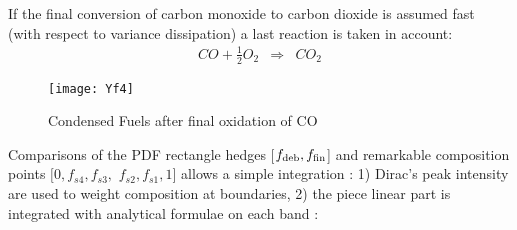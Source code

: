 If the final conversion of carbon monoxide to carbon dioxide is assumed fast
(with respect to variance dissipation) a last reaction is taken in account:
\begin{eqnarray}
CO + \displaystyle \frac{1}{2} O_{2} &\Rightarrow& CO_{2}
\end{eqnarray}
\begin{figure}[h!]
\centerline{\texttt{[image: Yf4]}}
\caption{Condensed Fuels after final oxidation of CO}
\end{figure}

Comparisons of the PDF rectangle hedges [$f_{\mbox{\scriptsize deb}} ,
f_{\mbox{\scriptsize fin}}$] and remarkable composition points $[0,
f_{\displaystyle s4}, f_{\displaystyle s3},$ $f_{\displaystyle s2},
f_{\displaystyle s1}, 1]$ allows a simple integration : 1) Dirac's peak
intensity are used to weight composition at boundaries, 2) the piece linear part
is integrated with analytical formulae on each band :
 
